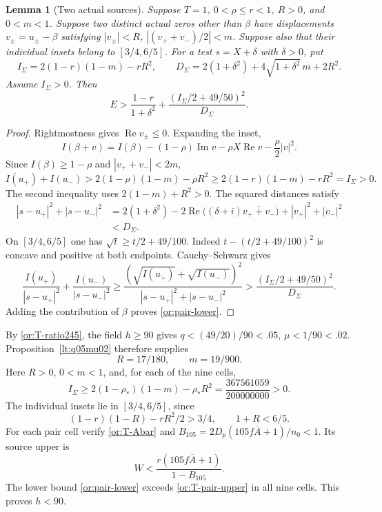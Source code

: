 \documentclass[11pt,reqno]{amsart}
\numberwithin{equation}{section}
\newtheorem{lemma}[theorem]{Lemma}
\theoremstyle{definition}
\theoremstyle{remark}
\renewcommand{\Re}{\operatorname{Re}}
\renewcommand{\Im}{\operatorname{Im}}
\begin{document}
\begin{lemma}[Two actual sources]\label{or:pair-source}
Suppose $T=1$, $0<\rho\le r<1$, $R>0$, and $0<m<1$.
Suppose two distinct actual zeros other than $\beta$ have
displacements $v_\pm=u_\pm-\beta$ satisfying
$|v_\pm|<R$, $|(v_++v_-)/2|<m$.  Suppose also that their individual
insets belong to $[3/4,6/5]$.  For a test
$s=X+\delta$ with $\delta>0$, put
\[
 I_\Sigma=2(1-r)(1-m)-rR^2,\qquad
 D_\Sigma=2(1+\delta^2)+4\sqrt{1+\delta^2}\,m+2R^2.
\]
Assume $I_\Sigma>0$.  Then
\begin{equation}\label{or:pair-lower}
        E>\frac{1-r}{1+\delta^2}
                    +\frac{(I_\Sigma/2+49/50)^2}{D_\Sigma}.
\end{equation}
\end{lemma}
\begin{proof}
Rightmostness gives $\Re v_\pm\le0$.  Expanding the inset,
\[
 I(\beta+v)=I(\beta)-(1-\rho)\Im v
                             -\rho X\Re v-\frac\rho2|v|^2.
\]
Since $I(\beta)\ge1-\rho$ and $|v_++v_-|<2m$,
\[
 I(u_+)+I(u_-)
 >2(1-\rho)(1-m)-\rho R^2
 \ge2(1-r)(1-m)-rR^2=I_\Sigma>0.
\]
The second inequality uses $2(1-m)+R^2>0$.
The squared distances satisfy
\[
 \begin{split}
 |s-u_+|^2+|s-u_-|^2
 &=2(1+\delta^2)
   -2\Re\bigl((\delta+i)\overline{v_++v_-}\bigr)
   +|v_+|^2+|v_-|^2\\
 &<D_\Sigma.
 \end{split}
\]
On $[3/4,6/5]$ one has $\sqrt t\ge t/2+49/100$.
Indeed $t-(t/2+49/100)^2$ is concave and positive at both endpoints.
Cauchy--Schwarz gives
\[
 \frac{I(u_+)}{|s-u_+|^2}+\frac{I(u_-)}{|s-u_-|^2}
 \ge\frac{(\sqrt{I(u_+)}+\sqrt{I(u_-)})^2}
              {|s-u_+|^2+|s-u_-|^2}
 >\frac{(I_\Sigma/2+49/50)^2}{D_\Sigma}.
\]
Adding the contribution of $\beta$ proves \eqref{or:pair-lower}.
\end{proof}

By \eqref{or:T-ratio245}, the field $h\ge90$ gives
$q<(49/20)/90<.05$, $\mu<1/90<.02$.
Proposition~\ref{lt:q05mu02} therefore supplies
\[
                          R=17/180,\qquad m=19/900.
\]
Here $R>0$, $0<m<1$, and, for each of the nine cells,
\[
 I_\Sigma\ge2(1-\rho_*)(1-m)-\rho_*R^2
             =\frac{367561059}{200000000}>0.
\]
The individual insets lie in $[3/4,6/5]$, since
\begin{equation}\label{or:pair-inset-gates}
          (1-r)(1-R)-rR^2/2>3/4,\qquad 1+R<6/5.
\end{equation}
For each pair cell verify \eqref{or:T-Abar} and
$B_{105}=2D_p(105f\overline A+1)/n_0<1$.  Its source upper is
\begin{equation}\label{or:T-pair-upper}
                  W<\frac{r(105f\overline A+1)}{1-B_{105}}.
\end{equation}
The lower bound \eqref{or:pair-lower} exceeds
\eqref{or:T-pair-upper} in all nine cells.  This proves $h<90$.
\end{document}
